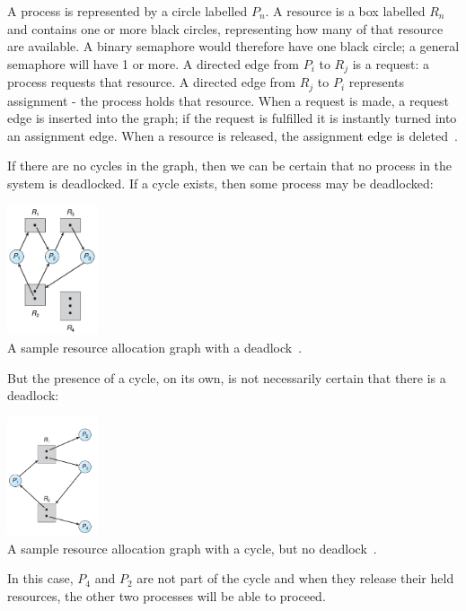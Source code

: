 A process is represented by a circle labelled $P_{n}$. A resource is a box labelled $R_{n}$ and contains one or more black circles, representing how many of that resource are available. A binary semaphore would therefore have one black circle; a general semaphore will have 1 or more. A directed edge from $P_{i}$ to $R_{j}$ is a request: a process requests that resource. A directed edge from $R_{j}$ to $P_{i}$ represents assignment - the process holds that resource. When a request is made, a request edge is inserted into the graph; if the request is fulfilled it is instantly turned into an assignment edge. When a resource is released, the assignment edge is deleted~\cite{osc}.

If there are no cycles in the graph, then we can be certain that no process in the system is deadlocked. If a cycle exists, then some process may be deadlocked:

\begin{center}
\includegraphics[width=0.20\textwidth]{images/rag2.png}\\
A sample resource allocation graph with a deadlock~\cite{osc}.
\end{center}

But the presence of a cycle, on its own, is not necessarily certain that there is a deadlock:

\begin{center}
\includegraphics[width=0.20\textwidth]{images/rag3.png}\\
A sample resource allocation graph with a cycle, but no deadlock~\cite{osc}.
\end{center}

In this case, $P_{4}$ and $P_{2}$ are not part of the cycle and when they release their held resources, the other two processes will be able to proceed.

